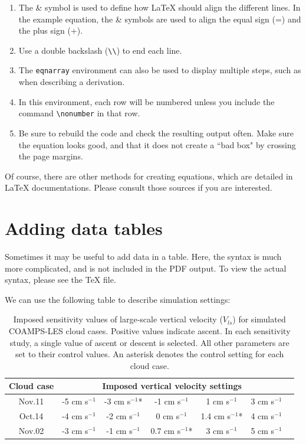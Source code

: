\documentclass[master]{UWMThesis}
\begin{document}
\begin{enumerate}
\item The \& symbol is used to define how LaTeX should align the different lines.  In the example equation, the \& symbols are used to align the equal sign (=) and the plus sign (+).

\item Use a double backslash (\verb=\\=) to end each line.

\item The \verb=eqnarray= environment can also be used to display multiple steps, such as when describing a derivation.

\item In this environment, each row will be numbered unless you include the command  \verb=\nonumber= in that row.

\item Be sure to rebuild the code and check the resulting output often.  Make sure the equation looks good, and that it does not create a ``bad box" by crossing the page margins.

\end{enumerate}

Of course, there are other methods for creating equations, which are detailed in LaTeX documentations.  Please consult those sources if you are interested.


\chapter{Adding data tables} \label{sec:data_tables}
Sometimes it may be useful to add data in a table.  Here, the syntax is much more complicated, and is not included in the PDF output.  To view the actual syntax, please see the TeX file.

We can use the following table to describe simulation settings:

\begin{table}[h]
\centering
\caption{Imposed sensitivity values of large-scale vertical velocity ($V_{ls}$) for simulated COAMPS-LES cloud cases.  Positive values indicate ascent.  In each sensitivity study, a single value of ascent or descent is selected.  All other parameters are set to their control values.  An asterisk denotes the control setting for each cloud case.}
\vspace{0.5pc}
\begin{tabular}{c|cccccc}
\hline
Cloud case & \multicolumn{5}{c}{Imposed vertical velocity settings} \\
\hline
Nov.11 & -5 cm s$^{-1}$ & -3 cm s$^{-1}$* & -1 cm s$^{-1}$ &   1 cm s$^{-1}$  & 3 cm s$^{-1}$ \\
Oct.14 & -4 cm s$^{-1}$ & -2 cm s$^{-1}$  &  0 cm s$^{-1}$ & 1.4 cm s$^{-1}$* & 4 cm s$^{-1}$ \\
Nov.02 & -3 cm s$^{-1}$ & -1 cm s$^{-1}$  &0.7 cm s$^{-1}$*&   3 cm s$^{-1}$  & 5 cm s$^{-1}$ \\
\hline
\end{tabular}

\label{tab:vel_ls_sens_list}
\end{table}
\end{document}

